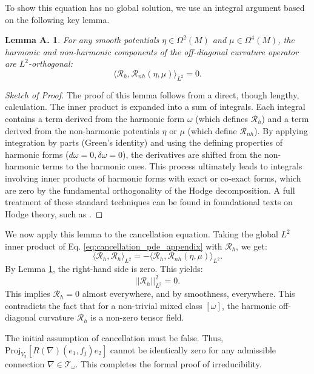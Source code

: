 \documentclass[12pt]{article}
\newtheorem{lemma*}{Lemma A.}[]
\begin{document}
To show this equation has no global solution, we use an integral argument based on the following key lemma.

\begin{lemma*} \label{lem:orthogonality}
For any smooth potentials $\eta \in \Omega^2(M)$ and $\mu \in \Omega^4(M)$, the harmonic and non-harmonic components of the off-diagonal curvature operator are $L^2$-orthogonal:
\[ \langle \mathcal{R}_h, \mathcal{R}_{nh}(\eta, \mu) \rangle_{L^2} = 0. \]
\end{lemma*}

\begin{proof}[Sketch of Proof]
The proof of this lemma follows from a direct, though lengthy, calculation. The inner product is expanded into a sum of integrals. Each integral contains a term derived from the harmonic form $\omega$ (which defines $\mathcal{R}_h$) and a term derived from the non-harmonic potentials $\eta$ or $\mu$ (which define $\mathcal{R}_{nh}$). By applying integration by parts (Green's identity) and using the defining properties of harmonic forms ($d\omega=0, \delta\omega=0$), the derivatives are shifted from the non-harmonic terms to the harmonic ones. This process ultimately leads to integrals involving inner products of harmonic forms with exact or co-exact forms, which are zero by the fundamental orthogonality of the Hodge decomposition. A full treatment of these standard techniques can be found in foundational texts on Hodge theory, such as \cite{Warner1983}.
\end{proof}

We now apply this lemma to the cancellation equation. Taking the global $L^2$ inner product of Eq. \eqref{eq:cancellation_pde_appendix} with $\mathcal{R}_h$, we get:
\[ \langle \mathcal{R}_h, \mathcal{R}_h \rangle_{L^2} = - \langle \mathcal{R}_h, \mathcal{R}_{nh}(\eta, \mu) \rangle_{L^2}. \]
By Lemma \ref{lem:orthogonality}, the right-hand side is zero. This yields:
\[ ||\mathcal{R}_h||^2_{L^2} = 0. \]
This implies $\mathcal{R}_h = 0$ almost everywhere, and by smoothness, everywhere. This contradicts the fact that for a non-trivial mixed class $[\omega]$, the harmonic off-diagonal curvature $\mathcal{R}_h$ is a non-zero tensor field.

The initial assumption of cancellation must be false. Thus, $\mathrm{Proj}_{V_2}[R(\nabla)(e_1, f_j)e_2]$ cannot be identically zero for any admissible connection $\nabla \in \mathcal{T}_\omega$. This completes the formal proof of irreducibility.
\end{document}
